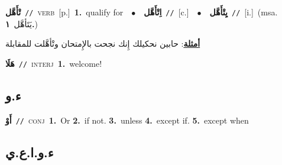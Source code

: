 \documentclass[10pt,a4paper,twoside]{article} %
\begin{document}
\begin{multicols}{2}
{\setlength\topsep{0pt}\textbf{\foreignlanguage{arabic}{تْأَهَّل}}\ {\color{gray}\texttt{//}\color{black}}\ \textsc{verb}\ [p.]\ \textbf{1.}~qualify for\ \ $\bullet$\ \ \setlength\topsep{0pt}\textbf{\foreignlanguage{arabic}{اِتْأَهَّل}}\ {\color{gray}\texttt{//}\color{black}}\ [c.]\ \ $\bullet$\ \ \setlength\topsep{0pt}\textbf{\foreignlanguage{arabic}{يِتْأَهَّل}}\ {\color{gray}\texttt{//}\color{black}}\ [i.]\ \color{gray}(msa. \foreignlanguage{arabic}{يَتَأهَّل}~\foreignlanguage{arabic}{\textbf{١.}})\color{black}\  \begin{flushright}\color{gray}\foreignlanguage{arabic}{\textbf{\underline{\foreignlanguage{arabic}{أمثلة}}}: حابين نحكيلك إِنك نجحت بالإِمتحان وتْأهَّلت للمقابلة}\end{flushright}\color{black}} \vspace{2mm}

{\setlength\topsep{0pt}\textbf{\foreignlanguage{arabic}{هَلَا}}\ {\color{gray}\texttt{//}\color{black}}\ \textsc{interj}\ \textbf{1.}~welcome!\ } \vspace{2mm}

\vspace{-3mm}
\subsection*{\color{blue}\foreignlanguage{arabic}{ء.و}\color{blue}{ (ntws)}} 

{\setlength\topsep{0pt}\textbf{\foreignlanguage{arabic}{أَوْ}}\ {\color{gray}\texttt{//}\color{black}}\ \textsc{conj}\ \textbf{1.}~Or  \textbf{2.}~if not.  \textbf{3.}~unless  \textbf{4.}~except if.  \textbf{5.}~except when\ } \vspace{2mm}

\vspace{-3mm}
\subsection*{\color{blue}\foreignlanguage{arabic}{ء.و.ا.ع.ي}\color{blue}{ (ntws)}} 


\end{multicols}
\end{document}
